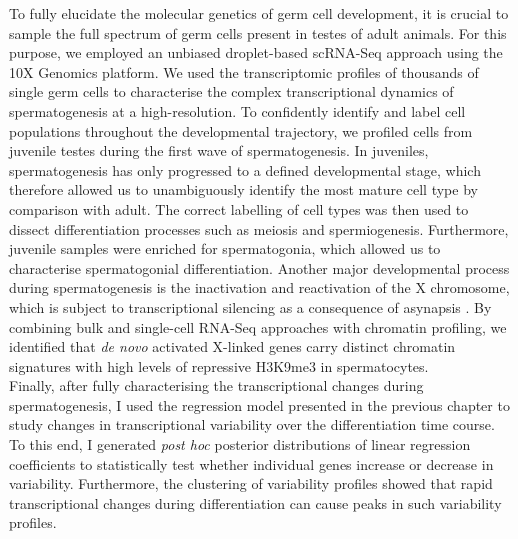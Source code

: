 To fully elucidate the molecular genetics of germ cell development, it is crucial to sample the full spectrum of germ cells present in testes of adult animals. 
For this purpose, we employed an unbiased droplet-based scRNA-Seq approach using the 10X Genomics\texttrademark{} platform. 
We used the transcriptomic profiles of thousands of single germ cells to characterise the complex transcriptional dynamics of spermatogenesis at a high-resolution. 
To confidently identify and label cell populations throughout the developmental trajectory, we profiled cells from juvenile testes during the first wave of spermatogenesis. 
In juveniles, spermatogenesis has only progressed to a defined developmental stage, which therefore allowed us to unambiguously identify the most mature cell type by comparison with adult. 
The correct labelling of cell types was then used to dissect differentiation processes such as meiosis and spermiogenesis. 
Furthermore, juvenile samples were enriched for spermatogonia, which allowed us to characterise spermatogonial differentiation. 
Another major developmental process during spermatogenesis is the inactivation and reactivation of the X chromosome, which is subject to transcriptional silencing as a consequence of asynapsis \citep{Turner2007}. 
By combining bulk and single-cell RNA-Seq approaches with chromatin profiling, we identified that \textit{de novo} activated X-linked genes carry distinct chromatin signatures with high levels of repressive H3K9me3 in spermatocytes. \\

Finally, after fully characterising the transcriptional changes during spermatogenesis, I used the regression model presented in the previous chapter to study changes in transcriptional variability over the differentiation time course. 
To this end, I generated \emph{post hoc} posterior distributions of linear regression coefficients to statistically test whether individual genes increase or decrease in variability. 
Furthermore, the clustering of variability profiles showed that rapid transcriptional changes during differentiation can cause peaks in such variability profiles.
